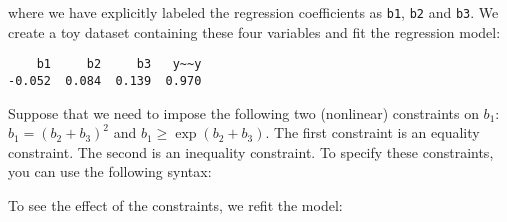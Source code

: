 where we have explicitly labeled the regression coefficients as
\texttt{b1}, \texttt{b2} and \texttt{b3}. We create a toy dataset
containing these four variables and fit the regression model:

\begin{Shaded}
\begin{Highlighting}[]
\NormalTok{(}\NormalTok{)}
\StringTok{ }\NormalTok{(} \NormalTok{(}\NormalTok{), }
                    \NormalTok{(}\NormalTok{), }
                    \NormalTok{(}\NormalTok{),}
                    \NormalTok{(}\NormalTok{))}
\StringTok{ }
\end{Highlighting}
\end{Shaded}

\begin{verbatim}
    b1     b2     b3   y~~y 
-0.052  0.084  0.139  0.970 
\end{verbatim}

Suppose that we need to impose the following two (nonlinear) constraints
on \(b_1\): \(b_1 = (b_2+b_3)^2\) and \(b_1 \geq \exp(b_2 + b_3)\). The
first constraint is an equality constraint. The second is an inequality
constraint. To specify these constraints, you can use the following
syntax:

\begin{Shaded}
\begin{Highlighting}[]
\end{Highlighting}
\end{Shaded}

To see the effect of the constraints, we refit the model:

\begin{Shaded}
\begin{Highlighting}[]
\StringTok{ }
\end{Highlighting}
\end{Shaded}

